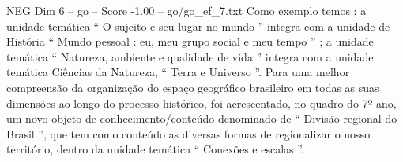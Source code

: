 \begin{textsample}{NEG Dim 6 – go – Score -1.00 – go/go\_ef\_7.txt}
Como exemplo temos : a unidade temática “ O sujeito e seu lugar no mundo ” integra com a unidade de História “ Mundo pessoal : eu, meu grupo social e meu tempo ” ; a unidade temática “ Natureza, ambiente e qualidade de vida ” integra com a unidade temática Ciências da Natureza, “ Terra e Universo ”.
Para uma melhor compreensão da organização do espaço geográfico brasileiro em todas as suas dimensões ao longo do processo histórico, foi acrescentado, no quadro do 7º ano, um novo objeto de conhecimento/conteúdo denominado de “ Divisão regional do Brasil ”, que tem como conteúdo as diversas formas de regionalizar o nosso território, dentro da unidade temática “ Conexões e escalas ”.

\end{textsample}
